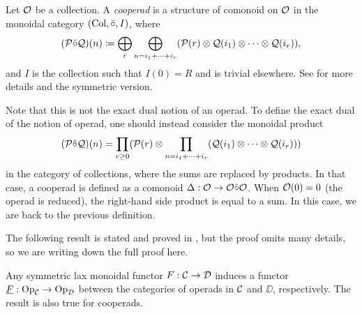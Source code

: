 \documentclass[Thesis.tex]{subfiles}
\begin{document}
\begin{defin}
Let ${\mathcal O}$ be a collection. A \emph{cooperad} is a structure of comonoid on ${\mathcal O}$ in the monoidal category $(\mathrm{Col}, \bar{\circ},I)$, where \[(\mathcal{P}\bar{\circ}\mathcal{Q})(n) \coloneqq
\bigoplus_r \bigoplus_{n=i_1+\cdots+i_r}(\mathcal{P}(r)\otimes \mathcal{Q}(i_1)\otimes\cdots\otimes \mathcal{Q}(i_r)),\]
and  $I$ is the collection such that $I(0)=R$ and is trivial elsewhere.
See \cite[\S 5.7.1]{lodayvallette} for more details and the symmetric version.
\end{defin}


Note that this is not the exact dual notion of an operad. To define the exact dual of the notion of operad, one should instead consider
the monoidal product
\[(\mathcal{P}\hat{\circ}\mathcal{Q})(n) =\prod_{r\geq 0}(\mathcal{P}(r)\otimes \prod_{n=i_1+\cdots+i_r}(\mathcal{Q}(i_1)\otimes\cdots\otimes \mathcal{Q}(i_r)))\]
in the category of collections, where the sums are replaced by products. In that case, a cooperad is defined as a comonoid $\Delta:{\mathcal O}\to{\mathcal O}\hat{\circ}{\mathcal O}$.
When ${\mathcal O}(0) = 0$ (the operad is reduced), the right-hand side product is equal to a sum. In this case, we are back to the previous definition.



The following result is stated and proved in \cite[Proposition 3.1.1(a)]{fresse}, but the proof omits many details, so we are writing down the full proof here.
\begin{propo}
Any symmetric lax monoidal functor $F:{\mathcal C}\to{\mathcal D}$ induces a functor $\underline{F}:\mathrm{Op}_{\mathcal C}\to \mathrm{Op}_{\mathcal D}$ between the categories of operads in ${\mathcal C}$ and $\DD$, respectively. The result is also true for cooperads.
\end{propo}
\end{document}
